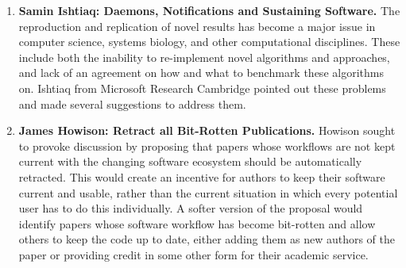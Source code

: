 \documentclass[11pt, oneside]{amsart}
\begin{document}
\begin{enumerate}
\item \textbf{Samin Ishtiaq: Daemons, Notifications and Sustaining Software.}
The reproduction and replication of novel results has become a major issue in
computer science, systems biology, and other computational disciplines. These
include both the inability to re-implement novel algorithms and approaches, and
lack of an agreement on how and what to benchmark these algorithms on.
Ishtiaq from Microsoft Research Cambridge pointed out these problems and 
made several suggestions to address them.


\item \textbf{James Howison: Retract all Bit-Rotten Publications.}
Howison sought to provoke discussion by proposing that papers whose workflows are
not kept current with the changing software ecosystem should be automatically
retracted. This would create an incentive for authors to keep their
software current and usable, rather than the current situation in which every
potential user has to do this individually. A softer version of the proposal
would identify papers whose software workflow has become bit-rotten and allow
others to keep the code up to date, either adding them as new authors of the
paper or providing credit in some other form for their academic service.





\end{enumerate}
\end{document}
